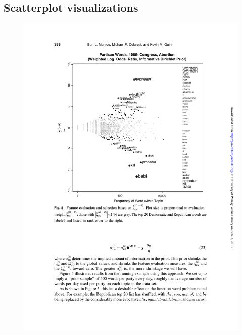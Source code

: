 \documentclass[11pt,a4paper]{article}
\begin{document}
\subsection{Scatterplot visualizations}
\vspace{-4mm}
\begin{figure}[h] 
\includegraphics[width=\columnwidth]{monroefull}

\end{figure}
\end{document}
